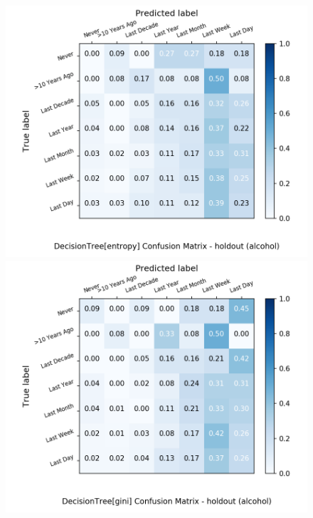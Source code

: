\documentclass{article}
\begin{document}
\begin{figure}[h!]
	\centering
	\begin{minipage}[b]{0.32\textwidth}
		\includegraphics[width=1.1\textwidth]{Plots/drugs/alcohol_DecisionTree_entropy_balance_False_holdout.png}
	\end{minipage}
	\begin{minipage}[b]{0.32\textwidth}
		\includegraphics[width=1.1\textwidth]{Plots/drugs/alcohol_DecisionTree_gini_balance_False_holdout.png}
	\end{minipage}

\end{figure}
\end{document}
